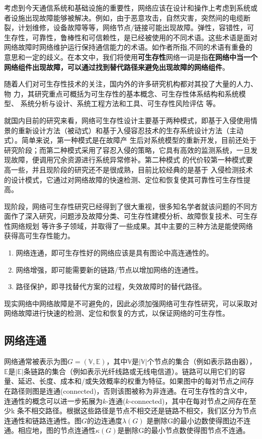 考虑到今天通信系统和基础设施的重要性，网络应该在设计和操作上考虑到系统或者设施出现故障能够被解决。例如，由于恶意攻击，自然灾害，突然间的电缆断裂，计划维修，设备故障等等，网络节点/链接可能出现故障。弹性，容错性，可生存性，可靠性，鲁棒性和可信赖性，是已经被使用的不同术语。这些术语是面对网络故障时网络维护运行保持通信能力的术语。如作者\cite{al2009comparative}所指,不同的术语有重叠的意思和一定的歧义。在本文中，我们将使用\textbf{可生存性}网络一词是指\textbf{在网络中当一个网络组件出现故障，可以通过找到替代路径来避免出现故障的网络组件}。

随着人们对可生存性技术的关注，国内外的许多研究机构都对其投了大量的人力、物 力，其研究重点可概括为可生存性的基本概念\cite{kuipers2012overview}、可生存性体系结构和系统模型\cite{luxinhua2006}、 系统分析与设计、系统工程方法和工具、可生存性风险评估\cite{linxuegang2006} 等。


就国内目前的研究来看，网络可生存性设计主要基于两种模式\cite{hanjianjun2007}，即基于入侵使用情景的重新设计方法（被动式）和基于入侵容忍技术的生存系统设计方法（主动式）。简单来说，第一种模式是在故障产 生后对系统模型的重新开发，目前还处于研究阶段；而第二种模式采用了容忍入侵的策略，它具有高效的监测系统，一旦发现故障，便调用冗余资源进行系统异常修补。第二种模式 的代价较第一种模式要高一些，并且现阶段的研究还不是很成熟，目前比较经典的是基于 入侵检测技术的设计模式，它通过对网络故障的快速检测、定位和恢复使其可靠性可生存性提高。

现阶段，网络可生存性研究已经得到了很大重视，很多知名学者就该问题的不同方面作了深入研究，问题涉及故障分类、可生存性建模分析、故障恢复技术、可生存性网络规划 等许多子领域，并取得了一些成果。其中主要的三种方法是能使网络获得高可生存性能力。
\begin{enumerate}
\item 网络连通，即可生存性好的网络应该是具有图论中高连通性的。
\item 网络增强，即可能需要新的链路/节点以增加网络的连通性。
\item 路径保护，即寻找替代方案的过程，失效故障时的替代路径。
\end{enumerate}


现实网络中网络故障是不可避免的，因此必须加强网络可生存性研究，可以采取对网络故障进行快速的检测、定位和恢复的方式，以保证网络的可生存性。
\subsection{网络连通}
网络通常被表示为图$G=(\mathbb{\mathbb{V}},\mathbb{\mathbb{E}})$，其中$\mathbb{\mathbb{V}}$是$|\mathbb{\mathbb{V}}|$个节点的集合（例如表示路由器），$\mathbb{\mathbb{E}}$是$|\mathbb{\mathbb{E}}|$条链路的集合（例如表示光纤线路或无线电信道）。链路可以用它们的容量、延迟、长度、成本和/或失效概率的权重为特征。如果图中的每对节点之间存在路径则图是连通(connected)，否则该图被称为非连通。在可生存性的含义中，连通性的概念可以进一步拓展为$k$-连通($k$-connected)，其中在每对节点之间存在至少k 条不相交路径。根据这些路径是节点不相交还是链路不相交，我们区分为节点连通性和链路连通性。图$G$的边连通度$\lambda(G)$ 是删除G的最小边数使得图边不连通。相应地，图的节点连通性$\kappa(G)$是删除G的最小节点数使得图节点不连通。

